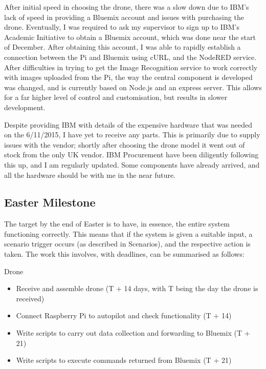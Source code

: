 \documentclass{article}
\begin{document}
\vspace{\baselineskip} \noindent
After initial speed in choosing the drone, there was a slow down due to IBM's lack of speed in providing a Bluemix account and issues with purchasing the drone. Eventually, I was required to ask my supervisor to sign up to IBM's Academic Initiative to obtain a Bluemix account, which was done near the start of December. After obtaining this account, I was able to rapidly establish a connection between the Pi and Bluemix using cURL, and the NodeRED service. After difficulties in trying to get the Image Recognition service to work correctly with images uploaded from the Pi, the way the central component is developed was changed, and is currently based on Node.js and an express server. This allows for a far higher level of control and customisation, but results in slower development.

\vspace{\baselineskip} \noindent
Despite providing IBM with details of the expensive hardware that was needed on the 6/11/2015, I have yet to receive any parts. This is primarily due to supply issues with the vendor; shortly after choosing the drone model it went out of stock from the only UK vendor. IBM Procurement have been diligently following this up, and I am regularly updated. Some components have already arrived, and all the hardware should be with me in the near future.

\subsection{Easter Milestone}
The target by the end of Easter is to have, in essence, the entire system functioning correctly. This means that if the system is given a suitable input, a scenario trigger occurs (as described in Scenarios), and the respective action is taken. The work this involves, with deadlines, can be summarised as follows:

\vspace{\baselineskip} \noindent
Drone
\begin{itemize}
    \item Receive and assemble drone (T + 14 days, with T being the day the drone is received)
    \item Connect Raspberry Pi to autopilot and check functionality (T + 14)
    \item Write scripts to carry out data collection and forwarding to Bluemix (T + 21)
    \item Write scripts to execute commands returned from Bluemix (T + 21)
\end{itemize}
\end{document}
